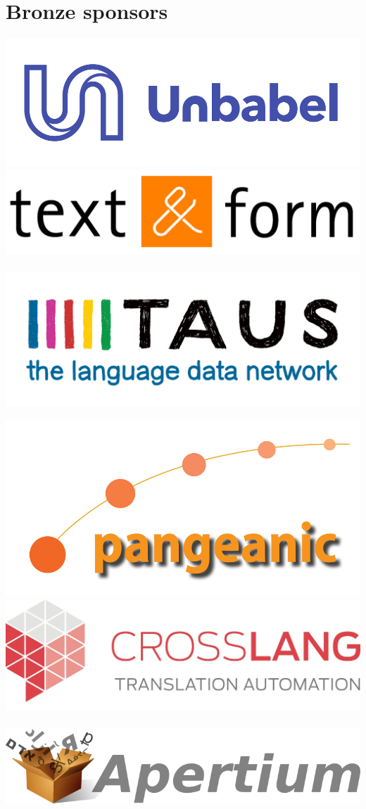 \documentclass[a4paper,11pt,twoside]{book}
\begin{document}
\vfill

\newpage

\section*{Bronze sponsors}

\includegraphics[width=0.50\columnwidth]{logos/unbabel-logo.png}\\

\hfill \includegraphics[width=0.50\columnwidth]{logos/textandform-logo.png}\\
\\

\includegraphics[width=0.50\columnwidth]{logos/taus-logo.png}

\hfill \includegraphics[width=0.50\columnwidth]{logos/pangeanic-logo.png}\\

\includegraphics[width=0.50\columnwidth]{logos/crosslang-logo.jpg}\\
\\

\hfill \includegraphics[width=0.50\columnwidth]{logos/apertium-logo.png}\\
\\
\end{document}

